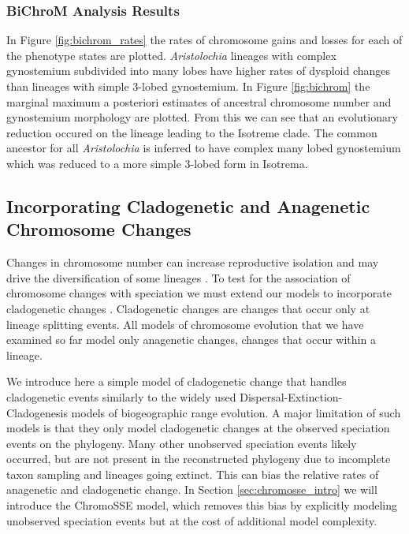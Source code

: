 \subsubsection{BiChroM Analysis Results}

In Figure \ref{fig:bichrom_rates} the rates of
chromosome gains and losses for each of the phenotype states are plotted.
\textit{Aristolochia} lineages with complex gynostemium subdivided into many lobes
have higher rates of dysploid changes than lineages with simple 3-lobed gynostemium.
In Figure \ref{fig:bichrom} the marginal maximum a posteriori estimates of ancestral
chromosome number and gynostemium morphology are plotted.
From this we can see that an evolutionary reduction occured on the lineage
leading to the Isotreme clade. The common ancestor for all
\textit{Aristolochia} is inferred to have complex many lobed
gynostemium which was reduced to a more simple 3-lobed form in Isotrema.  




\subsection{Incorporating Cladogenetic and Anagenetic Chromosome Changes}\label{subsect:clado_simple}

Changes in chromosome number can increase reproductive isolation and may drive the diversification
of some lineages \citep{stebbins1971chromosomal}. 
To test for the association
of chromosome changes with speciation we must extend our models to incorporate cladogenetic changes \citep[for details see][]{freyman2016cladogenetic}. 
Cladogenetic changes are changes that occur only at lineage splitting events.
All models of chromosome evolution that we have examined so far model
only anagenetic changes, \IE changes that occur within a lineage. 

We introduce here a simple model of cladogenetic change that handles cladogenetic events
similarly to the widely used Dispersal-Extinction-Cladogenesis \citep[DEC;][]{ree05,ree08} 
models of biogeographic range evolution.
A major limitation of such models is that they only model cladogenetic changes
at the observed speciation events on the phylogeny.
Many other unobserved speciation events likely occurred, but are not present
in the reconstructed phylogeny due to incomplete taxon sampling and lineages
going extinct. This can bias the relative rates of anagenetic and cladogenetic change.
In Section \ref{sec:chromosse_intro} we will introduce the
ChromoSSE model, which removes this bias by explicitly modeling unobserved speciation events but at the
cost of additional model complexity.

